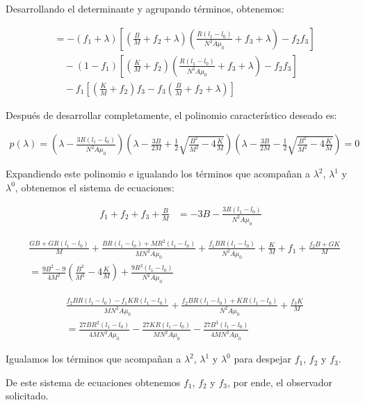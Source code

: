 \documentclass[
  11pt,
  letterpaper,
   addpoints,
   answers
  ]{exam}
\begin{document}
\begin{solution}
Desarrollando el determinante y agrupando términos, obtenemos:

\begin{align}
&= -(f_1 + \lambda)\left[\left(\frac{B}{M} + f_2 + \lambda\right)\left(\frac{R(l_1-l_0)}{N^2A\mu_0} + f_3 + \lambda\right) - f_2f_3\right] \\
&\quad - (1 - f_1)\left[\left(\frac{K}{M} + f_2\right)\left(\frac{R(l_1-l_0)}{N^2A\mu_0} + f_3 + \lambda\right) - f_2f_3\right] \\
&\quad - f_1\left[\left(\frac{K}{M} + f_2\right)f_3 - f_3\left(\frac{B}{M} + f_2 + \lambda\right)\right]
\end{align}

Después de desarrollar completamente, el polinomio característico deseado es:

\begin{align}
p(\lambda) = \left(\lambda - \frac{3R(l_1-l_0)}{N^2A\mu_0}\right)\left(\lambda - \frac{3B}{2M} + \frac{1}{2}\sqrt{\frac{B^2}{M^2} - 4\frac{K}{M}}\right)\left(\lambda - \frac{3B}{2M} - \frac{1}{2}\sqrt{\frac{B^2}{M^2} - 4\frac{K}{M}}\right) = 0
\end{align}

Expandiendo este polinomio e igualando los términos que acompañan a $\lambda^2$, $\lambda^1$ y $\lambda^0$, obtenemos el sistema de ecuaciones:

\begin{align}
f_1 + f_2 + f_3 + \frac{B}{M} &= -3B - \frac{3R(l_1-l_0)}{N^2A\mu_0}
\end{align}

\begin{align}
&\frac{GB + GR(l_1-l_0)}{M} + \frac{BR(l_1-l_0) + MR^2(l_1-l_0)}{MN^2A\mu_0} + \frac{f_1BR(l_1-l_0)}{N^2A\mu_0} + \frac{K}{M} + f_1 + \frac{f_2B + GK}{M} \\
&= \frac{9B^2 - 9}{4M^2}\left(\frac{B^2}{M^2} - 4\frac{K}{M}\right) + \frac{9R^2(l_1-l_0)}{N^2A\mu_0}
\end{align}

\begin{align}
&\frac{f_2BR(l_1-l_0) - f_1KR(l_1-l_0)}{MN^2A\mu_0} + \frac{f_2BR(l_1-l_0) + KR(l_1-l_0)}{N^2A\mu_0} + \frac{f_3K}{M} \\
&= \frac{27BR^2(l_1-l_0)}{4MN^2A\mu_0} - \frac{27KR(l_1-l_0)}{MN^2A\mu_0} - \frac{27B^3(l_1-l_0)}{4MN^2A\mu_0}
\end{align}

Igualamos los términos que acompañan a $\lambda^2$, $\lambda^1$ y $\lambda^0$ para despejar $f_1$, $f_2$ y $f_3$.

De este sistema de ecuaciones obtenemos $f_1$, $f_2$ y $f_3$, por ende, el observador solicitado.

\end{solution}
\end{document}
